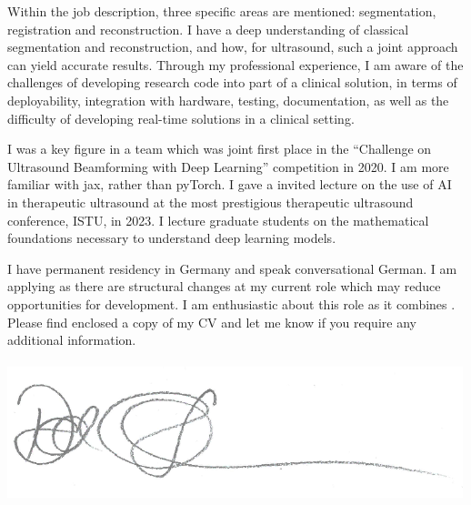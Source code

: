 \documentclass[11pt, a4paper, sans]{moderncv}
\makeatletter
\renewcommand*{\makeletterclosing}{
  \@closing\\%
  \includegraphics[scale=0.7]{sinden-signature.pdf}\\
  {\@firstname~\@lastname}%
  \ifthenelse{\isundefined{\@enclosure}}{}{%
    \\%
    \vfil%
    {\color{color2}\itshape\enclname: \@enclosure}}%
    \vfil}
\makeatother
\begin{document}
Within the job description, three specific areas are mentioned: segmentation, registration and reconstruction. I have a deep understanding of classical segmentation and reconstruction, and how, for ultrasound, such a joint approach can yield accurate results.  Through my professional experience, I am aware of the challenges of developing research code into part of a clinical solution, in terms of deployability, integration with hardware, testing, documentation, as well as the difficulty of developing real-time solutions in a clinical setting.

I was a key figure in a team which was joint first place in the \enquote{Challenge on Ultrasound Beamforming with Deep Learning} competition in 2020. I am more familiar with jax, rather than pyTorch. I gave a invited lecture on the use of AI in therapeutic ultrasound at the most prestigious therapeutic ultrasound conference, ISTU, in 2023. I lecture graduate students on the mathematical foundations necessary to understand deep learning models. 

I have permanent residency in Germany and speak conversational German. I am applying as there are structural changes at my current role which may reduce opportunities for development. I am enthusiastic about this role as it combines . Please find enclosed a copy of my CV and let me know if you require any additional information.   \\



\makeletterclosing
\end{document}
